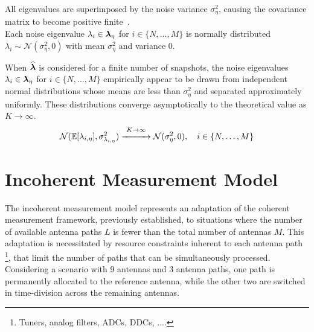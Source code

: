 All eigenvalues are superimposed by the noise variance \( \sigma_\eta^2 \), causing the covariance matrix to become positive
finite~\cite{tuncer.ch4, oap.ch5}. \\
Each noise eigenvalue \( \lambda_i \in \boldsymbol{\lambda}_{\eta}\) for \( i \in \{N, \ldots, M\} \) is normally distributed \( \lambda_i \sim \mathcal{N}(\sigma^2_{\eta}, 0) \)
with mean \( \sigma^2_{\eta} \) and variance 0.

When \( \widehat{\boldsymbol{\lambda}} \) is considered for a finite number of snapshots, the
noise eigenvalues \( \lambda_i \in \boldsymbol{\lambda}_{\eta}\) for \( i \in \{N, \ldots, M\} \) empirically appear to be drawn from independent normal distributions
whose means are less than \( \sigma^2_{\eta} \) and separated approximately uniformly.
These distributions converge asymptotically to the theoretical value as \( K \to \infty \).
\begin{equation}
    \mathcal{N}(\mathbb{E}[\lambda_{i, \eta}], \sigma^2_{\lambda_{i, \eta}}) \stackrel{K \rightarrow \infty}{\xrightarrow{\hspace*{1cm}}} \mathcal{N}(\sigma^2_{\eta}, 0), \quad i \in \{N, \ldots, M\}
\end{equation}

\section{Incoherent Measurement Model}
\label{sec:InherentMeasurementModel}

The incoherent measurement model represents an adaptation of the coherent measurement framework, previously established,
to situations where the number of available antenna paths \( L \) is fewer than the total number of antennas \( M \).
This adaptation is necessitated by resource constraints inherent to each antenna path%
\footnote{Tuners, analog filters, ADCs, DDCs, ...\cite{demmel}.},
that limit the number of paths that can be simultaneously processed.
Considering a scenario with 9 antennas and 3 antenna paths, one path is permanently allocated to the reference antenna,
while the other two are switched in time-division across the remaining antennas.

